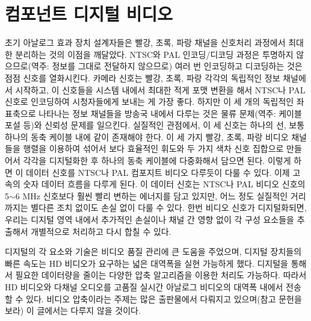 \section{컴포넌트 디지털 비디오}
초기 아날로그 효과 장치 설계자들은 빨강, 초록, 파랑 채널을 신호처리 과정에서 최대한 분리하는 것의 이점을 깨달았다.
NTSC와 PAL 인코딩/디코딩 과정은 투명하지 않으므로(역주: 정보를 그대로 전달하지 않으므로) 여러 번 인코딩하고 디코딩하는 것은 점점 신호를 열화시킨다.
카메라 신호는 빨강, 초록, 파랑 각각의 독립적인 정보 채널에서 시작하고, 이 신호들을 시스템 내에서 최대한 적게 포맷 변환을 해서 NTSC나 PAL 신호로 인코딩하여 시청자들에게 보내는 게 가장 좋다.
하지만 이 세 개의 독립적인 좌표축으로 나타나는 정보 채널들을 방송국 내에서 다루는 것은 물류 문제(역주: 케이블 포설 등)와 신뢰성 문제를 일으킨다.
실질적인 관점에서, 이 세 신호는 하나의 선, 보통 하나의 동축 케이블 내에 같이 존재해야 한다.
이 세 가지 빨강, 초록, 파랑 비디오 채널들을 행렬을 이용하여 섞어서 보다 효율적인 휘도와 두 가지 색차 신호 집합으로 만들어서 각각을 디지털화한 후 하나의 동축 케이블에 다중화해서 담으면 된다.
이렇게 하면 이 데이터 신호를 NTSC나 PAL 컴포지트 비디오 다루듯이 다룰 수 있다. 이제 고속의 숫자 데이터 흐름을 다루게 된다.
이 데이터 신호는 NTSC나 PAL 비디오 신호의 5$\sim$6 MHz 신호보다 훨씬 빨리 변하는 에너지를 담고 있지만, 어느 정도 실질적인 거리까지는 별다른 조치 없이도 손실 없이 다룰 수 있다.
한번 비디오 신호가 디지털화되면, 우리는 디지털 영역 내에서 추가적인 손실이나 채널 간 영향 없이 각 구성 요소들을 추출해서 개별적으로 처리하고 다시 합칠 수 있다.


디지털의 각 요소와 기술은 비디오 품질 관리에 큰 도움을 주었으며, 디지털 장치들의 빠른 속도는 HD 비디오가 요구하는 넓은 대역폭을 실현 가능하게 했다.
디지털을 통해서 필요한 데이터량을 줄이는 다양한 압축 알고리즘을 이용한 처리도 가능하다.
따라서 HD 비디오와 다채널 오디오를 고품질 실시간 아날로그 비디오의 대역폭 내에서 전송할 수 있다.
비디오 압축이라는 주제는 많은 출판물에서 다뤄지고 있으며(참고 문헌을 보라) 이 글에서는 다루지 않을 것이다.